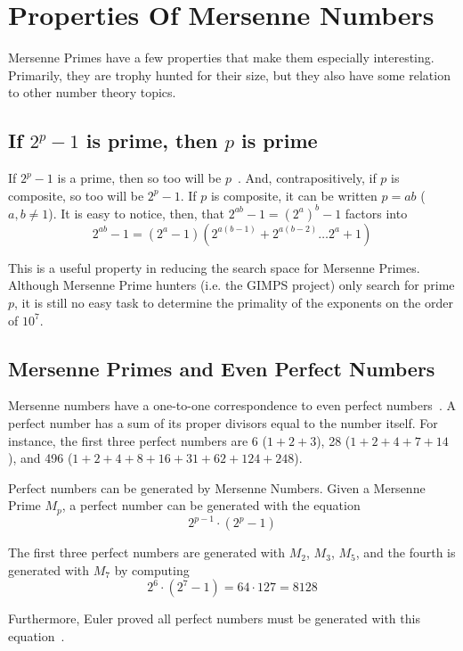 \section{Properties Of Mersenne Numbers}

Mersenne Primes have a few properties that make them especially interesting. Primarily, they
are trophy hunted for their size, but they also have some relation to other number theory topics.

\subsection{If $2^p-1$ is prime, then $p$ is prime}

If $2^p-1$ is a prime, then so too will be $p$~\cite{LighNeal}. And, contrapositively, if $p$ is composite,
so too will be $2^p-1$. If $p$ is composite, it can be written $p = ab$ ($a,b \ne 1$). It is easy to notice, then,
that $2^{ab} - 1 = (2^a)^b - 1$ factors into 
\begin{equation}
    2^{ab} - 1 = (2^a-1)(2^{a(b-1)} + 2^{a(b-2)} \ldots 2^{a} + 1)
\end{equation}

This is a useful property in reducing the search space for Mersenne Primes. Although Mersenne Prime hunters
(i.e. the GIMPS project) only search for prime $p$, it is still no easy task to determine the primality
of the exponents on the order of $10^{7}$.

\subsection{Mersenne Primes and Even Perfect Numbers}

Mersenne numbers have a one-to-one correspondence to even perfect numbers~\cite{maple}. A perfect number has
a sum of its proper divisors equal to the number itself. For instance, the first three perfect numbers
are 6 ($1 + 2 + 3$), 28 ($1 + 2 + 4 + 7 + 14$), and 496 ($1 + 2 + 4 + 8 + 16 + 31 + 62 + 124 + 248$).

Perfect numbers can be generated by Mersenne Numbers. Given a Mersenne Prime $M_p$, a perfect number can be
generated with the equation
\begin{equation}
\label{eqn:perfno}
2^{p-1}\cdot(2^p-1)
\end{equation}

The first three perfect numbers are generated with $M_2$, $M_3$, $M_5$, and the fourth is generated with $M_7$ by computing 
\[ 2^6\cdot(2^7-1) = 64\cdot127 = 8128 \]

Furthermore, Euler proved all perfect numbers must be generated with this equation~\cite{perfect}.
